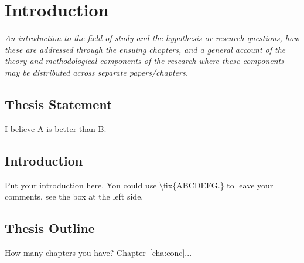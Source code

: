 \chapter{Introduction}
\label{cha:intro}

\emph{An introduction to the field of study and the hypothesis or research questions, how these are addressed through the ensuing chapters, and a general account of the theory and methodological components of the research where these components may be distributed across separate papers/chapters.}


\section{Thesis Statement}
\label{sec:thesisstatement}
I believe A is better than B.


\section{Introduction}
\label{sec:problemstatement}
Put your introduction here. You could use \textbackslash fix\{ABCDEFG.\} to
leave your comments, see the box at the left side.  



\section{Thesis Outline}
\label{sec:outline}
How many chapters you have? Chapter~\ref{cha:conc}...
